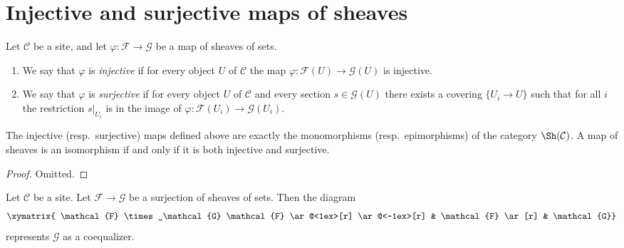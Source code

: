 \section{Injective and surjective maps of sheaves}
\label{section-sheaves-injective}

\begin{definition}
\label{definition-sheaves-injective-surjective}
Let $\mathcal{C}$ be a site, and let $\varphi : \mathcal{F}
\to \mathcal{G}$ be a map of sheaves of sets.
\begin{enumerate}
\item We say that $\varphi$ is {\it injective} if for every object
$U$ of $\mathcal{C}$ the map $\varphi : \mathcal{F}(U)
\to \mathcal{G}(U)$ is injective.
\item We say that $\varphi$ is {\it surjective} if for every object
$U$ of $\mathcal{C}$ and every section $s\in \mathcal{G}(U)$
there exists a covering $\{U_i \to U\}$ such that for
all $i$ the restriction $s|_{U_i}$ is in the image of
$\varphi : \mathcal{F}(U_i) \to \mathcal{G}(U_i)$.
\end{enumerate}
\end{definition}

\begin{lemma}
\label{lemma-mono-epi-sheaves}
The injective (resp.\ surjective) maps defined above
are exactly the monomorphisms (resp.\ epimorphisms) of
the category $\Sh(\mathcal{C})$. A map of sheaves
is an isomorphism if and only if it is both injective
and surjective.
\end{lemma}

\begin{proof}
Omitted.
\end{proof}

\begin{lemma}
\label{lemma-coequalizer-surjection}
Let $\mathcal{C}$ be a site. Let $\mathcal{F} \to \mathcal{G}$
be a surjection of sheaves of sets. Then the diagram
$$
\xymatrix{
\mathcal{F} \times_\mathcal{G} \mathcal{F}
\ar@<1ex>[r] \ar@<-1ex>[r]
&
\mathcal{F} \ar[r]
&
\mathcal{G}}
$$
represents $\mathcal{G}$ as a coequalizer.
\end{lemma}

